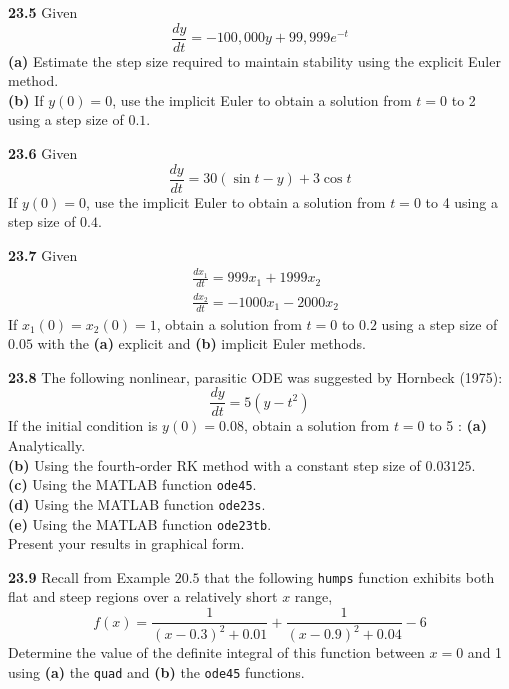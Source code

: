 \documentclass[../main.tex]{subfiles}
\begin{document}
\begin{multicols}{2}
    \noindent \textbf{23.5} Given
    $$
    \frac{d y}{d t}=-100,000 y+99,999 e^{-t}
    $$
    \textbf{(a)} Estimate the step size required to maintain stability using the explicit Euler method.\\
    \textbf{(b)} If $y(0)=0$, use the implicit Euler to obtain a solution from $t=0$ to 2 using a step size of $0.  1$.\vspace{2mm}

    \noindent \textbf{23.6} Given
    $$
    \frac{d y}{d t}=30(\sin t-y)+3 \cos t
    $$
    If $y(0)=0$, use the implicit Euler to obtain a solution from $t=0$ to 4 using a step size of $0.4$.\vspace {2mm}

    \noindent \textbf{23.7} Given
    $$
    \begin{aligned}
    &\frac{d x_{1}}{d t}=999 x_{1}+1999 x_{2} \\
    &\frac{d x_{2}}{d t}=-1000 x_{1}-2000 x_{2}
    \end{aligned}
    $$
    If $x_{1}(0)=x_{2}(0)=1$, obtain a solution from $t=0$ to $0.2$ using a step size of $0.05$ with the \textbf{   (a)} explicit and \textbf{(b)} implicit Euler methods.\vspace{2mm}

    \noindent \textbf{23.8} The following nonlinear, parasitic ODE was suggested by Hornbeck (1975):
    $$
    \frac{d y}{d t}=5\left(y-t^{2}\right)
    $$
    If the initial condition is $y(0)=0.08$, obtain a solution from $t=0$ to 5 :
    \textbf{(a)} Analytically.\\
    \textbf{(b)} Using the fourth-order RK method with a constant step size of $0.03125$.\\
    \textbf{(c)} Using the MATLAB function \texttt{ode45}.\\
    \textbf{(d)} Using the MATLAB function \texttt{ode23s}.\\
    \textbf{(e)} Using the MATLAB function \texttt{ode23tb}.\\
    Present your results in graphical form.\vspace{2mm}

    \noindent \textbf{23.9} Recall from Example $20.5$ that the following \texttt{humps} function exhibits both     flat and steep regions over a relatively short $x$ range,
    $$
    f(x)=\frac{1}{(x-0.3)^{2}+0.01}+\frac{1}{(x-0.9)^{2}+0.04}-6
    $$
    Determine the value of the definite integral of this function between $x=0$ and 1 using \textbf{(a)} the \texttt{quad} and \textbf{(b)} the \texttt{ode45} functions.\vspace{2mm}


\end{multicols}
\end{document}

